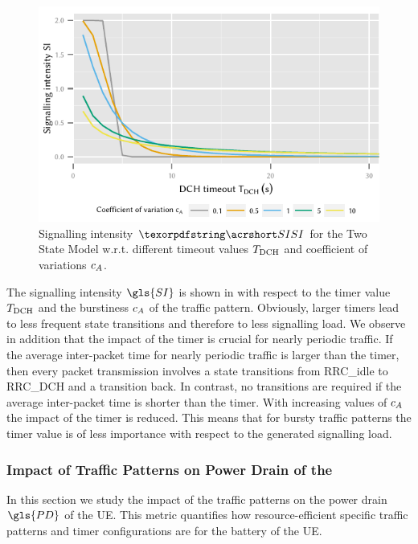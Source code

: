 \begin{figure}
	\centering
	\includegraphics{network/performance_model/numerical_examples/figures/2state_tdch_si}
	\caption{Signalling intensity \(\headershortacr{SI}\) for the Two State Model w.r.t. different timeout values \(T_{\text{DCH}}\) and coefficient of variations \(c_{A}\).}
	\label{fig:network:performance_model:numerical_examples:validations:analytic_vs_simulation:2state_tdch_si}
\end{figure}


The signalling intensity \(\gls{SI}\) is shown in  with respect to the timer value \(T_{\text{DCH}}\) and the burstiness \(c_{A}\) of the traffic pattern.
Obviously, larger timers lead to less frequent state transitions and therefore to less signalling load.
We observe in addition that the impact of the timer is crucial for nearly periodic traffic.
If the average inter-packet time for nearly periodic traffic is larger than the timer, then every packet transmission involves a state transitions from \gls{RRC_idle} to \gls{RRC_DCH} and a transition back.
In contrast, no transitions are required if the average inter-packet time is shorter than the timer.
With increasing values of \(c_{A}\) the impact of the timer is reduced.
This means that for bursty traffic patterns the timer value is of less importance with respect to the generated signalling load.

\subsubsection*{Impact of Traffic Patterns on Power Drain of the }\label{sec:network:performance_model:power_drain}
In this section we study the impact of the traffic patterns on the power drain \(\gls{PD}\) of the \gls{UE}.
This metric quantifies how resource-efficient specific traffic patterns and timer configurations are for the battery of the \gls{UE}.

